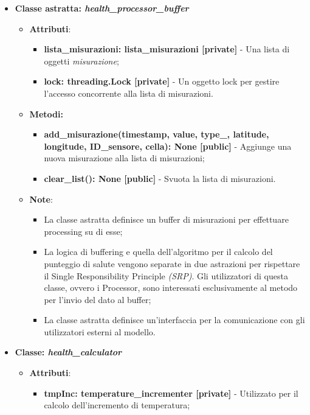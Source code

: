 \begin{itemize}
    \item\textbf{Classe astratta: \textit{health\_processor\_buffer}}
    \begin{itemize}
    \item\textbf{Attributi}:
        \begin{itemize}
        \item \textbf{lista\_misurazioni: lista\_misurazioni [private]} - Una lista di oggetti \textit{misurazione};
        \item \textbf{lock: threading.Lock [private]} - Un oggetto lock per gestire l'accesso concorrente alla lista di misurazioni.
    \end{itemize}
    \item \textbf{Metodi:}
    \begin{itemize}
        \item \textbf{add\_misurazione(timestamp, value, type\_, latitude, longitude, ID\_sensore, cella): None [public]} - Aggiunge una nuova misurazione alla lista di misurazioni;
        \item \textbf{clear\_list(): None [public]} - Svuota la lista di misurazioni.
    \end{itemize}
    \item\textbf{Note}:
        \begin{itemize}
            \item La classe astratta definisce un buffer di misurazioni per effettuare processing su di esse;
            \item La logica di buffering e quella dell'algoritmo per il calcolo del punteggio di salute vengono separate in due astrazioni per rispettare il Single Responsibility Principle \textit{(SRP)}. Gli utilizzatori di questa classe, ovvero i Processor, sono interessati esclusivamente al metodo per l'invio del dato al buffer;
            \item La classe astratta definisce un'interfaccia per la comunicazione con gli utilizzatori esterni al modello.
        \end{itemize}
    \end{itemize}
    \item{\textbf{Classe: \textit{health\_calculator}}}
    \begin{itemize}
    \item\textbf{Attributi}:
        \begin{itemize}
        \item \textbf{tmpInc: temperature\_incrementer [private]} - Utilizzato per il calcolo dell'incremento di temperatura;

\end{itemize}
\end{itemize}
\end{itemize}
